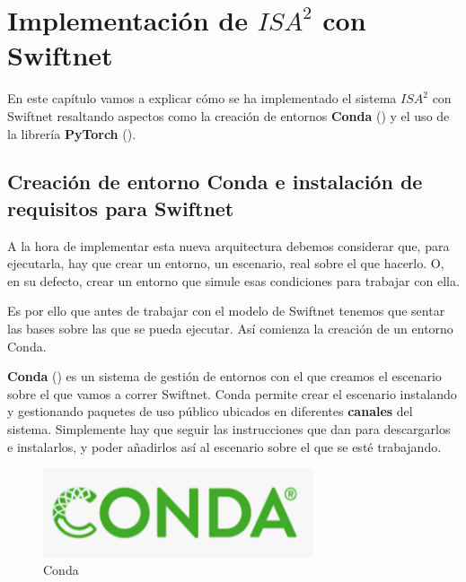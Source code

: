 \chapter{Implementación de $ISA^{2}$ con Swiftnet}
\label{ch:imp}

En este capítulo vamos a explicar cómo se ha implementado el sistema $ISA^{2}$ con Swiftnet resaltando aspectos como la creación de entornos \textbf{Conda} (\cite{conda}) y el uso de la librería \textbf{PyTorch} (\cite{pytorch}).

\section{Creación de entorno Conda e instalación de requisitos para Swiftnet}
A la hora de implementar esta nueva arquitectura debemos considerar que, para ejecutarla, hay que crear un entorno, un escenario, real sobre el que hacerlo. O, en su defecto, crear un entorno que simule esas condiciones para trabajar con ella.

Es por ello que antes de trabajar con el modelo de Swiftnet tenemos que sentar las bases sobre las que se pueda ejecutar. Así comienza la creación de un entorno Conda.

\textbf{Conda} (\cite{conda}) es un sistema de gestión de entornos con el que creamos el escenario sobre el que vamos a correr Swiftnet. Conda permite crear el escenario instalando y gestionando paquetes de uso público ubicados en diferentes \textbf{canales} del sistema. Simplemente hay que seguir las instrucciones que dan para descargarlos e instalarlos, y poder añadirlos así al escenario sobre el que se esté trabajando.

\begin{figure}[H]
  \centering
  \includegraphics[width=8cm]{Figuras/Conda.eps}
  \caption{Conda}
\end{figure}

